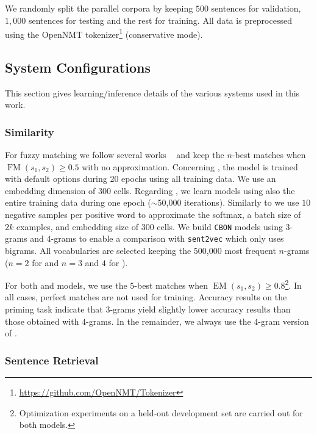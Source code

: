 We randomly split the parallel corpora by keeping $500$ sentences for validation, $1,000$ sentences for testing and the rest for training.
All data is preprocessed using the OpenNMT tokenizer\footnote{\url{https://github.com/OpenNMT/Tokenizer}} (conservative mode). 

\subsection{System Configurations}
\label{ssec:config}

This section gives learning/inference details of the various systems used in this work.

\subsubsection*{Similarity} 

For fuzzy matching  we follow several works ~\cite{Koehn10convergence,bulte19neural,xu20boosting} and keep the $n$-best matches when $\operatorname{FM}(s_1,s_2) \geq 0.5$ with no approximation.
%
Concerning , the model is trained with default options during 20 epochs using all training data. We use an embedding dimension of 300 cells. %
%
Regarding , we learn models using also the entire training data during one epoch ($\sim$50,000 iterations). Similarly to  we use $10$ negative samples per positive word to approximate the softmax, a batch size of $2k$ examples, and embedding size of 300 cells. 
%
We build \texttt{CBON} models using $3$-grams and $4$-grams to enable a comparison with \texttt{sent2vec} which only uses bigrams.
All vocabularies are selected keeping the 500,000 most frequent $n$-grams ($n=2$ for  and $n=3$ and $4$ for ).

For both  and  models, we use the $5$-best matches when $\operatorname{EM}(s_1,s_2) \geq 0.8$\footnote{Optimization experiments on a held-out development set are carried out for both models.}. 
In all cases, perfect matches are not used for training.
%
Accuracy results on the priming task indicate that $3$-grams yield slightly lower accuracy results than those obtained with $4$-grams. In the remainder, we always use the $4$-gram version of .

\subsubsection*{Sentence Retrieval}

